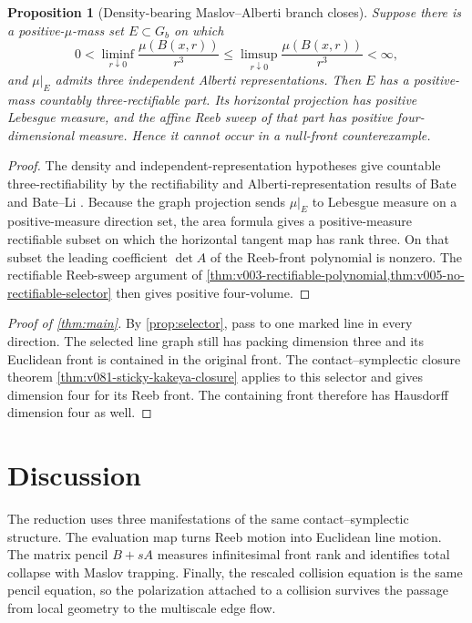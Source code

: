 \documentclass[10pt]{article}
\newtheorem{proposition}[theorem]{Proposition}
\begin{document}
\begin{proposition}[Density-bearing Maslov--Alberti branch closes]
\label{prop:v046-alberti-gate}
Suppose there is a positive-\(\mu\)-mass set \(E\subset G_b\) on which
\[
0<\liminf_{r\downarrow0}\frac{\mu(B(x,r))}{r^3}
\le
\limsup_{r\downarrow0}\frac{\mu(B(x,r))}{r^3}
<\infty,
\]
and \(\mu|_E\) admits three independent Alberti representations.  Then \(E\) has a positive-mass
countably three-rectifiable part.  Its horizontal projection has positive Lebesgue measure, and the
affine Reeb sweep of that part has positive four-dimensional measure.  Hence it cannot occur in a
null-front counterexample.
\end{proposition}

\begin{proof}
The density and independent-representation hypotheses give countable three-rectifiability by the
rectifiability and Alberti-representation results of Bate and Bate--Li
\cite{Bate2015,BateLi2017}.  Because the graph projection sends
\(\mu|_E\) to Lebesgue measure on a positive-measure direction set, the area formula gives a
positive-measure rectifiable subset on which the horizontal tangent map has rank three.  On that
subset the leading coefficient \(\det A\) of the Reeb-front polynomial is nonzero.  The rectifiable
Reeb-sweep argument of
\cref{thm:v003-rectifiable-polynomial,thm:v005-no-rectifiable-selector} then gives positive
four-volume.
\end{proof}

\begin{proof}[Proof of \cref{thm:main}]
By \cref{prop:selector}, pass to one marked line in every direction.  The selected
line graph still has packing dimension three and its Euclidean front is contained in
the original front.  The contact--symplectic closure theorem
\cref{thm:v081-sticky-kakeya-closure} applies to this selector and gives dimension four
for its Reeb front.  The containing front therefore has Hausdorff dimension four as well.
\end{proof}

\section{Discussion}

The reduction uses three manifestations of the same contact--symplectic structure. The evaluation
map turns Reeb motion into Euclidean line motion. The matrix pencil $B+sA$ measures infinitesimal
front rank and identifies total collapse with Maslov trapping. Finally, the rescaled collision
equation is the same pencil equation, so the polarization attached to a collision survives the
passage from local geometry to the multiscale edge flow.
\end{document}

